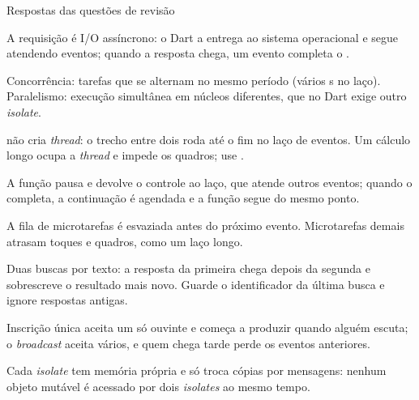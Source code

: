 \documentclass[aspectratio=169,10pt]{beamer}
\begin{document}
\begin{frame}{Respostas das questões de revisão}
  \begin{respostas}
    \item A requisição é I/O assíncrono: o Dart a entrega ao sistema operacional e segue atendendo eventos; quando a resposta chega, um evento completa o .
    \item Concorrência: tarefas que se alternam no mesmo período (vários s no laço). Paralelismo: execução simultânea em núcleos diferentes, que no Dart exige outro \emph{isolate}.
    \item {} não cria \emph{thread}: o trecho entre dois  roda até o fim no laço de eventos. Um cálculo longo ocupa a \emph{thread} e impede os quadros; use .
    \item A função pausa e devolve o controle ao laço, que atende outros eventos; quando o  completa, a continuação é agendada e a função segue do mesmo ponto.
    \item A fila de microtarefas é esvaziada antes do próximo evento. Microtarefas demais atrasam toques e quadros, como um laço longo.
    \item Duas buscas por texto: a resposta da primeira chega depois da segunda e sobrescreve o resultado mais novo. Guarde o identificador da última busca e ignore respostas antigas.
    \item Inscrição única aceita um só ouvinte e começa a produzir quando alguém escuta; o \emph{broadcast} aceita vários, e quem chega tarde perde os eventos anteriores.
    \item Cada \emph{isolate} tem memória própria e só troca cópias por mensagens: nenhum objeto mutável é acessado por dois \emph{isolates} ao mesmo tempo.
  \end{respostas}
\end{frame}

\end{document}

